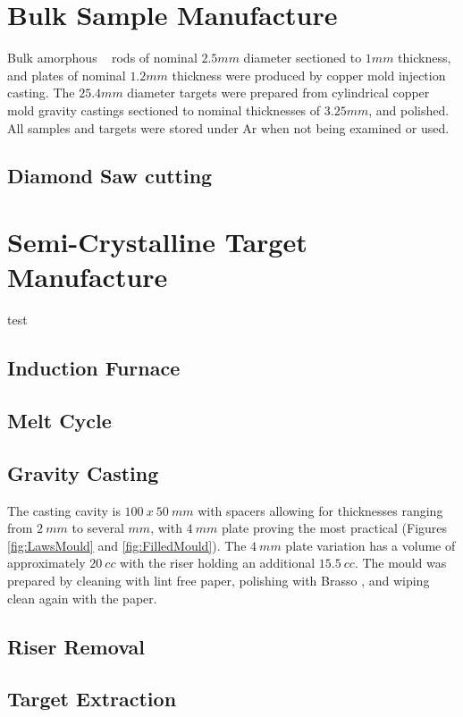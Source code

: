 \documentclass[a4paper,12pt,oneside]{report}%
\begin{document}
\section{Bulk Sample Manufacture}

Bulk amorphous \MgZnCa~ rods of nominal $2.5 mm$ diameter sectioned to $1mm$ thickness, and plates of nominal $1.2 mm$ thickness were produced by copper mold injection casting. The $25.4 mm$ diameter targets were prepared from cylindrical copper mold gravity castings sectioned to nominal thicknesses of $3.25mm$, and polished. All samples and targets were stored under Ar when not being examined or used. 

\subsection{Diamond Saw cutting}

\section{Semi-Crystalline Target Manufacture} 
test
\subsection{Induction Furnace}

\subsection{Melt Cycle}

\subsection{Gravity Casting}

The casting cavity is $100~ x~ 50~ mm$ with spacers allowing for thicknesses ranging from $2~ mm$ to several $mm$, with $4~ mm$ plate proving the most practical (Figures \ref{fig:LawsMould} and \ref{fig:FilledMould}). The $4~ mm$ plate variation has a volume of approximately $20~ cc$ with the riser holding an additional $15.5~ cc$. The mould was prepared by cleaning with lint free paper, polishing with Brasso \textcopyright, and wiping clean again with the paper.

\subsection{Riser Removal} 

\subsection{Target Extraction}
\end{document}
